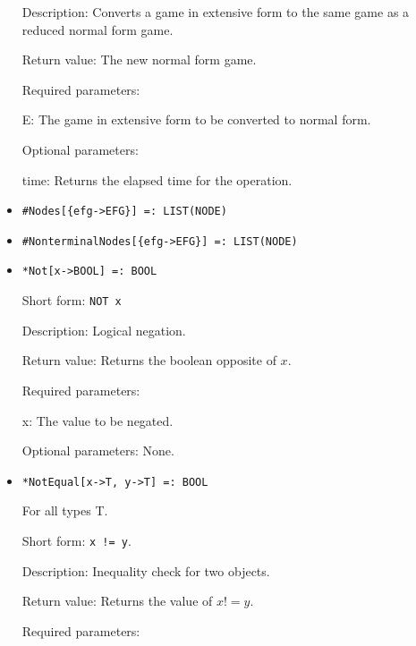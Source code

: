 \begin{itemize}
\bd
\item
[Description:] Converts a game in extensive form to the same
game as a reduced normal form game.
\item
[Return value:] The new normal form game.
\item
[Required parameters:]\hfil\null
	
\bd
\item
[E:] The game in extensive form to be converted to normal form.
\ed

\item
[Optional parameters:]\hfil\null
	
\bd
\item
[time:] Returns the elapsed time for the operation.
\ed
\ed

\item
\protect \large \begin{verbatim} 
#Nodes[{efg->EFG}] =: LIST(NODE)
\end{verbatim}\normalsize

\item
\protect \large \begin{verbatim} 
#NonterminalNodes[{efg->EFG}] =: LIST(NODE)
\end{verbatim}\normalsize

\item
\protect \large \begin{verbatim}
*Not[x->BOOL] =: BOOL
\end{verbatim}\normalsize

\bd
\item
[Short form:] \verb+NOT x+
\item
[Description:] Logical negation.
\item
[Return value:] Returns the boolean opposite of $x$.  
\item
[Required parameters:]\hfil\null
\bd
\item
[x:] The value to be negated.
\ed
\item
[Optional parameters:] None.
\ed

\item
\protect \large \begin{verbatim}
*NotEqual[x->T, y->T] =: BOOL
\end{verbatim}\normalsize

For all types T.

\bd
\item
[Short form:] \verb+x != y+.
\item
[Description:] Inequality check for two objects.
\item
[Return value:] Returns the value of $x != y$.
\item
[Required parameters:]\hfil\null
	

\end{itemize}
